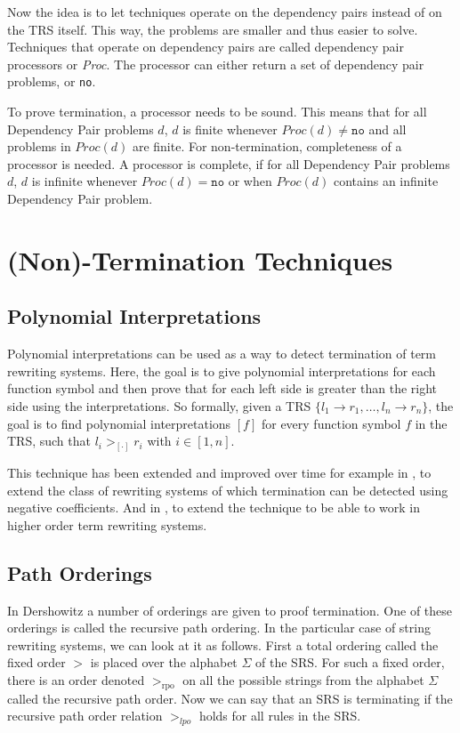 Now the idea is to let techniques operate on the dependency pairs instead of on the TRS itself. This way, the problems are smaller and thus easier to solve. Techniques that operate on dependency pairs are called dependency pair processors or \textit{Proc}. The processor can either return a set of dependency pair problems, or \texttt{no}. 

To prove termination, a processor needs to be sound. This means that for all Dependency Pair problems $d$, $d$ is finite whenever $\textit{Proc}(d) \neq \texttt{no}$ and all problems in $\textit{Proc}(d)$ are finite. For non-termination, completeness of a processor is needed. A processor is complete, if for all Dependency Pair problems $d$, $d$ is infinite whenever $\textit{Proc}(d) = \texttt{no}$ or when $\textit{Proc}(d)$ contains an infinite Dependency Pair problem.  

\section{(Non)-Termination Techniques}
\subsection*{Polynomial Interpretations}
Polynomial interpretations \cite{BENCHERIFA1987137} can be used as a way to detect termination of term rewriting systems. Here, the goal is to give polynomial interpretations for each function symbol and then prove that for each left side is greater than the right side using the interpretations. So formally, given a TRS $\{ l_1 \rightarrow r_1, \dots, l_n \rightarrow r_n \}$, the goal is to find polynomial interpretations $\left[ f \right]$ for every function symbol $f$ in the TRS, such that $l_i >_{\left[ \cdot \right]} r_i$ with $i \in [1, n]$. 

This technique has been extended and improved over time for example in \cite{HIROKAWA:PolyNeg}, to extend the class of rewriting systems of which termination  can be detected using negative coefficients. And in \cite{FUHSKOP:PolyHO}, to extend the technique to be able to work in higher order term rewriting systems.
\subsection*{Path Orderings}
In Dershowitz \cite{DERSHOWITZ1982279} a number of orderings are given to proof termination. One of these orderings is called the recursive path ordering. In the particular case of string rewriting systems, we can look at it as follows\cite{ZANTEMA:TORPA}. First a total ordering called the fixed order $>$ is placed over the alphabet $\Sigma$ of the SRS. For such a fixed order, there is an order denoted $>_{\text{rpo}}$ on all the possible strings from the alphabet $\Sigma$ called the recursive path order. Now we can say that an SRS is terminating if the recursive path order relation $>_{\textit{lpo}}$ holds for all rules in the SRS. 


